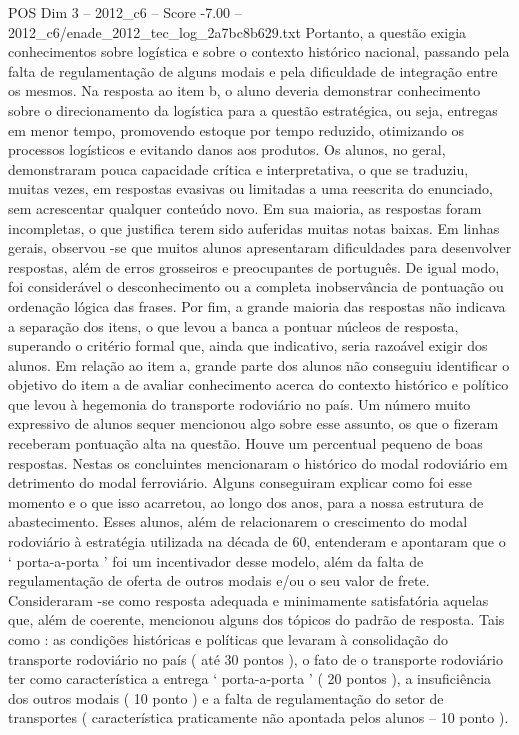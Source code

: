 \begin{textsample}{POS Dim 3 – 2012\_c6 – Score -7.00 – 2012\_c6/enade\_2012\_tec\_log\_2a7bc8b629.txt}
Portanto, a questão exigia conhecimentos sobre logística e sobre o contexto histórico nacional, passando pela falta de regulamentação de alguns modais e pela dificuldade de integração entre os mesmos.
Na resposta ao item b, o aluno deveria demonstrar conhecimento sobre o direcionamento da logística para a questão estratégica, ou seja, entregas em menor tempo, promovendo estoque por tempo reduzido, otimizando os processos logísticos e evitando danos aos produtos.
Os alunos, no geral, demonstraram pouca capacidade crítica e interpretativa, o que se traduziu, muitas vezes, em respostas evasivas ou limitadas a uma reescrita do enunciado, sem acrescentar qualquer conteúdo novo.
Em sua maioria, as respostas foram incompletas, o que justifica terem sido auferidas muitas notas baixas.
Em linhas gerais, observou -se que muitos alunos apresentaram dificuldades para desenvolver respostas, além de erros grosseiros e preocupantes de português.
De igual modo, foi considerável o desconhecimento ou a completa inobservância de pontuação ou ordenação lógica das frases.
Por fim, a grande maioria das respostas não indicava a separação dos itens, o que levou a banca a pontuar núcleos de resposta, superando o critério formal que, ainda que indicativo, seria razoável exigir dos alunos.
Em relação ao item a, grande parte dos alunos não conseguiu identificar o objetivo do item a de avaliar conhecimento acerca do contexto histórico e político que levou à hegemonia do transporte rodoviário no país.
Um número muito expressivo de alunos sequer mencionou algo sobre esse assunto, os que o fizeram receberam pontuação alta na questão.
Houve um percentual pequeno de boas respostas.
Nestas os concluintes mencionaram o histórico do modal rodoviário em detrimento do modal ferroviário.
Alguns conseguiram explicar como foi esse momento e o que isso acarretou, ao longo dos anos, para a nossa estrutura de abastecimento.
Esses alunos, além de relacionarem o crescimento do modal rodoviário à estratégia utilizada na década de 60, entenderam e apontaram que o ‘ porta-a-porta ’ foi um incentivador desse modelo, além da falta de regulamentação de oferta de outros modais e/ou o seu valor de frete.
Consideraram -se como resposta adequada e minimamente satisfatória aquelas que, além de coerente, mencionou alguns dos tópicos do padrão de resposta.
Tais como : as condições históricas e políticas que levaram à consolidação do transporte rodoviário no país ( até 30 pontos ), o fato de o transporte rodoviário ter como característica a entrega ‘ porta-a-porta ’ ( 20 pontos ), a insuficiência dos outros modais ( 10 ponto ) e a falta de regulamentação do setor de transportes ( característica praticamente não apontada pelos alunos – 10 ponto ).

\end{textsample}
